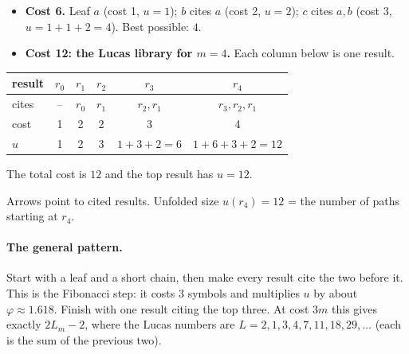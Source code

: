 \documentclass[11pt]{article}
\begin{document}
\begin{itemize}
\item \textbf{Cost 6.} Leaf $a$ (cost 1, $u=1$); $b$ cites $a$ (cost 2, $u=2$); $c$ cites
  $a,b$ (cost 3, $u=1+1+2=4$). Best possible: $4$.
\item \textbf{Cost 12: the Lucas library for $m=4$.} Each column below is one result.
\end{itemize}
\begin{center}\small
\begin{tabular}{lccccc}
\toprule
result & $r_0$ & $r_1$ & $r_2$ & $r_3$ & $r_4$ \\
\midrule
cites & -- & $r_0$ & $r_1$ & $r_2, r_1$ & $r_3, r_2, r_1$\\
cost & 1 & 2 & 2 & 3 & 4 \\
$u$ & 1 & 2 & 3 & $1+3+2=6$ & $1+6+3+2=12$\\
\bottomrule
\end{tabular}
\end{center}
\noindent The total cost is $12$ and the top result has $u=12$.

\begin{center}

\small Arrows point to cited results. Unfolded size $u(r_4)=12$ = the number of paths
starting at $r_4$.
\end{center}

\paragraph{The general pattern.} Start with a leaf and a short chain, then make every
result cite the two before it. This is the Fibonacci step: it costs $3$ symbols and
multiplies $u$ by about $\varphi\approx1.618$. Finish with one result citing the top
three. At cost $3m$ this gives exactly $2L_m-2$, where the Lucas numbers are
$L=2,1,3,4,7,11,18,29,\ldots$ (each is the sum of the previous two).
\end{document}
